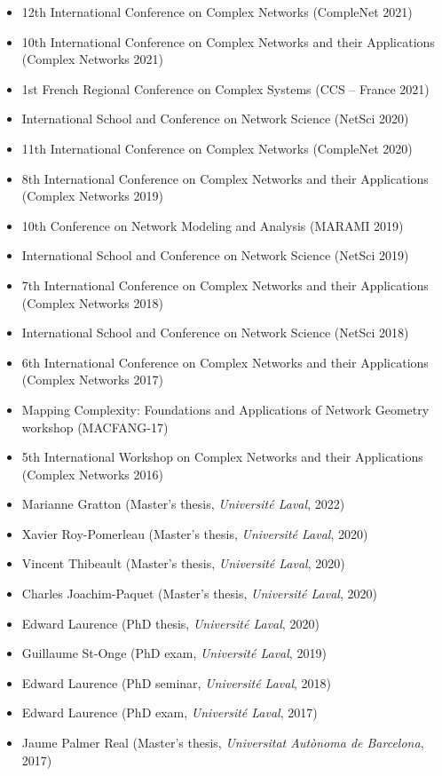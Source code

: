 \documentclass[11pt]{article}
\newcommand{\SousTitreA}[2]{{\normalsize\textbf{#1} #2 \vspace{-0.5\baselineskip}}}
\newcommand{\SousTitreB}[2]{{\vspace{0.4\baselineskip}\SousTitreA{#1}{#2}}}
\newlength{\EspaceListe}
\begin{document}
\begin{itemize}[itemsep=\EspaceListe]
  \item 12th International Conference on Complex Networks (CompleNet 2021)
  \item 10th International Conference on Complex Networks and their Applications (Complex Networks 2021)
  \item 1st French Regional Conference on Complex Systems (CCS -- France 2021)
  \item International School and Conference on Network Science (NetSci 2020)
  \item 11th International Conference on Complex Networks (CompleNet 2020)
  \item 8th International Conference on Complex Networks and their Applications (Complex Networks 2019)
  \item 10th Conference on Network Modeling and Analysis (MARAMI 2019)
  \item International School and Conference on Network Science (NetSci 2019)
  \item 7th International Conference on Complex Networks and their Applications (Complex Networks 2018)
  \item International School and Conference on Network Science (NetSci 2018)
  \item 6th International Conference on Complex Networks and their Applications (Complex Networks 2017)
  \item Mapping Complexity: Foundations and Applications of Network Geometry workshop (MACFANG-17)
  \item 5th International Workshop on Complex Networks and their Applications (Complex Networks 2016)
\end{itemize}
%
%
%
\SousTitreB{Thesis jury}{}
%
\begin{itemize}[itemsep=\EspaceListe]
  \item Marianne Gratton (Master's thesis, \textit{Universit\'e Laval}, 2022)
  \item Xavier Roy-Pomerleau (Master's thesis, \textit{Universit\'e Laval}, 2020)
  \item Vincent Thibeault (Master's thesis, \textit{Universit\'e Laval}, 2020)
  \item Charles Joachim-Paquet (Master's thesis, \textit{Universit\'e Laval}, 2020)
  \item Edward Laurence (PhD thesis, \textit{Universit\'e Laval}, 2020)
  \item Guillaume St-Onge (PhD exam, \textit{Universit\'e Laval}, 2019)
  \item Edward Laurence (PhD seminar, \textit{Universit\'e Laval}, 2018)
  \item Edward Laurence (PhD exam, \textit{Universit\'e Laval}, 2017)
  \item Jaume Palmer Real (Master's thesis, \textit{Universitat Aut\`onoma de Barcelona}, 2017)
\end{itemize}
\end{document}
